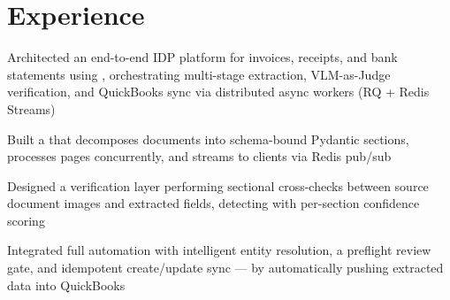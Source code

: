 \documentclass[]{deedy-resume-openfont}
\begin{document}
\begin{minipage}[t]{0.66\textwidth}

\section{Experience}


\noindent{}\par\vspace{1.5pt}
\begin{tightemize}
\item Architected an end-to-end IDP platform for invoices, receipts, and bank statements using , orchestrating multi-stage extraction, VLM-as-Judge verification, and QuickBooks sync via distributed async workers (RQ + Redis Streams)
\item Built a  that decomposes documents into schema-bound Pydantic sections, processes pages concurrently, and streams  to clients via Redis pub/sub
\item Designed a  verification layer performing sectional cross-checks between source document images and extracted fields, detecting  with per-section confidence scoring
\item Integrated full  automation with intelligent entity resolution, a preflight review gate, and idempotent create/update sync ---  by automatically pushing extracted data into QuickBooks
\end{tightemize}


\end{minipage}
\end{document}
